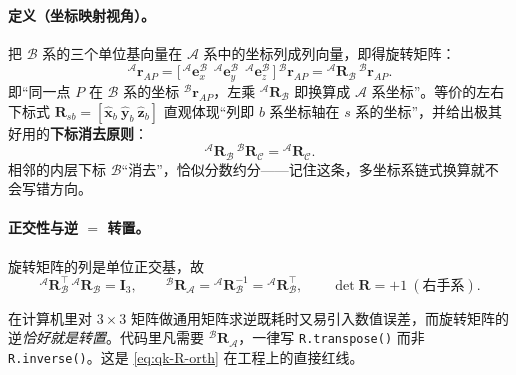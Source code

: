 \paragraph{定义（坐标映射视角）。}
把 $\mathcal{B}$ 系的三个单位基向量在 $\mathcal{A}$ 系中的坐标列成列向量，即得旋转矩阵\cite{yu2021quadruped,unitree2023quadruped}：
\begin{equation}
  {}^{\mathcal{A}}\boldsymbol{r}_{AP}=\big[\,{}^{\mathcal{A}}\mathbf{e}_x^{\mathcal{B}}\ \ {}^{\mathcal{A}}\mathbf{e}_y^{\mathcal{B}}\ \ {}^{\mathcal{A}}\mathbf{e}_z^{\mathcal{B}}\,\big]\,{}^{\mathcal{B}}\boldsymbol{r}_{AP}
  ={}^{\mathcal{A}}\mathbf{R}_{\mathcal{B}}\,{}^{\mathcal{B}}\boldsymbol{r}_{AP}.
  \label{eq:qk-R-def}
\end{equation}
即“同一点 $P$ 在 $\mathcal{B}$ 系的坐标 ${}^{\mathcal{B}}\boldsymbol{r}_{AP}$，左乘 ${}^{\mathcal{A}}\mathbf{R}_{\mathcal{B}}$ 即换算成 $\mathcal{A}$ 系坐标”。等价的左右下标式 $\mathbf{R}_{sb}=[\hat{\boldsymbol{x}}_b\ \hat{\boldsymbol{y}}_b\ \hat{\boldsymbol{z}}_b]$ 直观体现“列即 $b$ 系坐标轴在 $s$ 系的坐标”，并给出极其好用的\textbf{下标消去原则}\cite{unitree2023quadruped}：
\begin{equation}
  {}^{\mathcal{A}}\mathbf{R}_{\mathcal{B}}\,{}^{\mathcal{B}}\mathbf{R}_{\mathcal{C}}={}^{\mathcal{A}}\mathbf{R}_{\mathcal{C}}.
  \label{eq:qk-R-cancel}
\end{equation}
相邻的内层下标 $\mathcal{B}$“消去”，恰似分数约分——记住这条，多坐标系链式换算就不会写错方向。

\paragraph{正交性与逆 $=$ 转置。}
旋转矩阵的列是单位正交基，故\cite{yu2021quadruped,unitree2023quadruped}
\begin{equation}
  {}^{\mathcal{A}}\mathbf{R}_{\mathcal{B}}^{\top}\,{}^{\mathcal{A}}\mathbf{R}_{\mathcal{B}}=\mathbf{I}_3,\qquad
  {}^{\mathcal{B}}\mathbf{R}_{\mathcal{A}}={}^{\mathcal{A}}\mathbf{R}_{\mathcal{B}}^{-1}={}^{\mathcal{A}}\mathbf{R}_{\mathcal{B}}^{\top},\qquad
  \det\mathbf{R}=+1\ (\text{右手系}).
  \label{eq:qk-R-orth}
\end{equation}

\begin{pitfall}[误区：对旋转矩阵求逆而非转置]
在计算机里对 $3\times3$ 矩阵做通用矩阵求逆既耗时又易引入数值误差，而旋转矩阵的逆\emph{恰好就是转置}\cite{unitree2023quadruped}。代码里凡需要 ${}^{\mathcal{B}}\mathbf{R}_{\mathcal{A}}$，一律写 \texttt{R.\allowbreak transpose()} 而非 \texttt{R.inverse()}。这是 \cref{eq:qk-R-orth} 在工程上的直接红线。
\end{pitfall}

